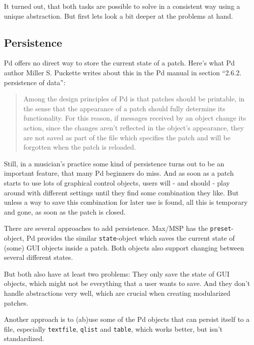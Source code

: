 \documentclass[10pt,english]{scrartcl}
\begin{document}
It turned out, that both tasks are possible to solve in a consistent way
using a unique abstraction. But first lets look a bit deeper at the
problems at hand.



\hypertarget{persistence}{}
\subsection*{Persistence}

Pd offers no direct way to store the current state of a patch. Here's what
Pd author Miller S. Puckette writes about this in the Pd manual in section
``2.6.2.  persistence of data'':
\begin{quote}

Among the design principles of Pd is that patches should be printable,
in the sense that the appearance of a patch should fully determine its
functionality. For this reason, if messages received by an object
change its action, since the changes aren't reflected in the object's
appearance, they are not saved as part of the file which specifies the
patch and will be forgotten when the patch is reloaded.
\end{quote}

Still, in a musician's practice some kind of persistence turns out to be an
important feature, that many Pd beginners do miss. And as soon as a patch
starts to use lots of graphical control objects, users will - and should -
play around with different settings until they find some combination they
like. But unless a way to save this combination for later use is found, all
this is temporary and gone, as soon as the patch is closed.

There are several approaches to add persistence. Max/MSP has the
\texttt{preset}-object, Pd provides the similar \texttt{state}-object which saves the
current state of (some) GUI objects inside a patch. Both objects also
support changing between several different states.

But both also have at least two problems: They only save the state of GUI
objects, which might not be everything that a user wants to save. And they
don't handle abstractions very well, which are crucial when creating
modularized patches.

Another approach is to (ab)use some of the Pd objects that can persist
itself to a file, especially \texttt{textfile}, \texttt{qlist} and \texttt{table}, which
works better, but isn't standardized.
\end{document}
